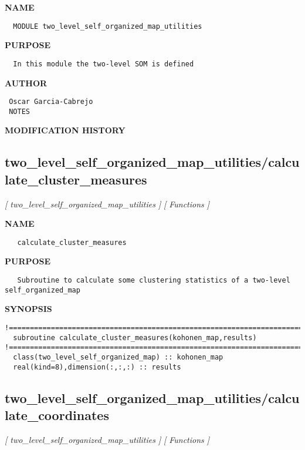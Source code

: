 \documentclass{article}
\begin{document}
\label{ch:robo8}
\label{ch:Kohonen_two_level_self_organized_map_utilities}
\textbf{NAME}
\begin{verbatim}
  MODULE two_level_self_organized_map_utilities
\end{verbatim}
\textbf{PURPOSE}
\begin{verbatim}
  In this module the two-level SOM is defined 
\end{verbatim}
\textbf{AUTHOR}
\begin{verbatim}
 Oscar Garcia-Cabrejo
 NOTES 
\end{verbatim}
\textbf{MODIFICATION HISTORY}
\newpage
\subsection{two\_level\_self\_organized\_map\_utilities/calculate\_cluster\_measures}
\textsl{[ two\_level\_self\_organized\_map\_utilities ]}
\textsl{[ Functions ]}

\label{ch:robo62}
\label{ch:two_level_self_organized_map_utilities_calculate_cluster_measures}
\textbf{NAME}
\begin{verbatim}
   calculate_cluster_measures
\end{verbatim}
\textbf{PURPOSE}
\begin{verbatim}
   Subroutine to calculate some clustering statistics of a two-level self_organized_map 
\end{verbatim}
\textbf{SYNOPSIS}
\begin{verbatim}
!========================================================================================
  subroutine calculate_cluster_measures(kohonen_map,results)
!========================================================================================
  class(two_level_self_organized_map) :: kohonen_map
  real(kind=8),dimension(:,:,:) :: results
\end{verbatim}
\newpage
\subsection{two\_level\_self\_organized\_map\_utilities/calculate\_coordinates}
\textsl{[ two\_level\_self\_organized\_map\_utilities ]}
\textsl{[ Functions ]}
\end{document}
